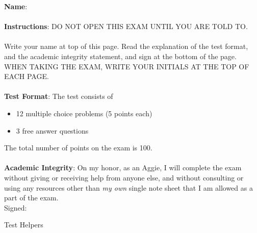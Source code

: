\documentclass[11  pt]{exam}
\newcommand{\hide}[1]{\underline{\phantom{#1 #1}}}
\begin{document}
    \begin{center}
    \end{center}
    
    \noindent\textbf{Name}: \hide{your name here}  \\ \\
    
    \noindent\textbf{Instructions}: DO NOT OPEN THIS EXAM UNTIL YOU ARE TOLD TO. \\ \\
    
    \noindent Write your name at top of this page. Read the explanation of the test format, and the academic integrity statement, and sign at the bottom of the page. WHEN TAKING THE EXAM, WRITE YOUR INITIALS AT THE TOP OF EACH PAGE.\\ \\
    
    \noindent\textbf{Test Format}: The test consists of 
    
    \begin{itemize}
        \item 12 multiple choice problems (5 points each)
        \item 3 free answer questions
    \end{itemize}
    The total number of points on the exam is 100. \\ \\
    
    \noindent\textbf{Academic Integrity}: On my honor, as an Aggie, I will complete the exam without giving or receiving help from anyone else, and without consulting or using any resources other than \emph{my own} single note sheet that I am allowed as a part of the exam. \\
    
    \noindent Signed: \hide{your signature here} \\
    

    

    \newpage
    \noindent \begin{center}Test Helpers\end{center}
\end{document}
